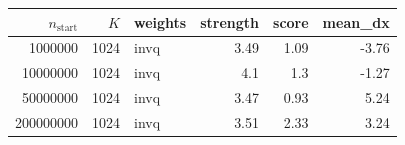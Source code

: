 \begin{tabular}{r r l r r r}
\hline
$n_{\mathrm{start}}$ & $K$ & weights & strength & score & mean\_dx \\
\hline
1000000 & 1024 & invq & 3.49 & 1.09 & -3.76 \\
10000000 & 1024 & invq & 4.1 & 1.3 & -1.27 \\
50000000 & 1024 & invq & 3.47 & 0.93 & 5.24 \\
200000000 & 1024 & invq & 3.51 & 2.33 & 3.24 \\
\hline
\end{tabular}
